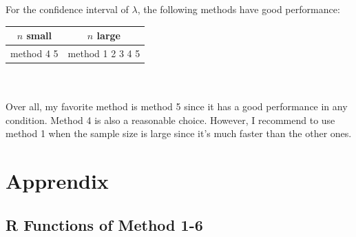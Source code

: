 \documentclass[12pt]{article}
\begin{document}
For the confidence interval of $\lambda$, the following methods have good performance:\\

\begin{tabular}{|c|c|}
\hline
  $n$ small & $n$ large\\
 \hline
method 4 5  &  method 1 2 3 4 5\\
\hline
\end{tabular}
\\
\\

Over all, my favorite method is method 5 since it has a good performance in any condition.  Method 4 is also a reasonable choice. However, I recommend to use method 1 when the sample size is large since it's much faster than the other ones. \\

\newpage

\section{Apprendix}
\subsection{R Functions of Method 1-6}

\noindent\makebox[\linewidth]{\rule{\textwidth}{1pt}}

\noindent\makebox[\linewidth]{\rule{\textwidth}{1pt}}
\end{document}
